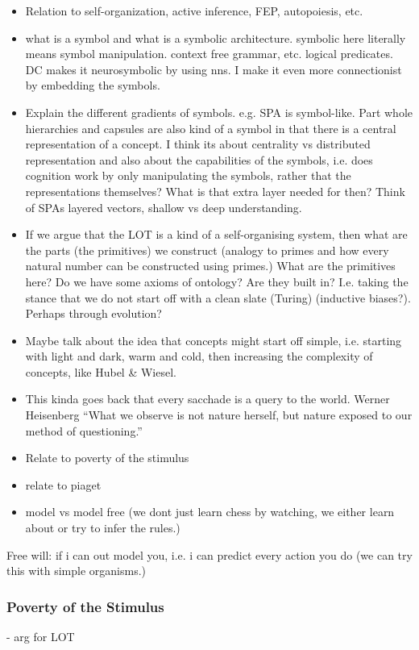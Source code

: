 \begin{itemize}
    \item Relation to self-organization, active inference, FEP, autopoiesis, etc. 
    \item what is a symbol and what is a symbolic architecture. symbolic here literally means symbol manipulation. context free grammar, etc. logical predicates. DC makes it neurosymbolic by using nns. I make it even more connectionist by embedding the symbols.
    \item Explain the different gradients of symbols. e.g. SPA is symbol-like. Part whole hierarchies and capsules are also kind of a symbol in that there is a central representation of a concept. I think its about centrality vs distributed representation and also about the capabilities of the symbols, i.e. does cognition work by only manipulating the symbols, rather that the representations themselves? What is that extra layer needed for then? Think of SPAs layered vectors, shallow vs deep understanding.
    \item If we argue that the LOT is a kind of a self-organising system, then what are the parts (the primitives) we construct (analogy to primes and how every natural number can be constructed using primes.) What are the primitives here? Do we have some axioms of ontology? Are they built in? I.e. taking the stance that we do not start off with a clean slate (Turing) (inductive biases?). Perhaps through evolution? 
    \item Maybe talk about the idea that concepts might start off simple, i.e. starting with light and dark, warm and cold, then increasing the complexity of concepts, like Hubel \& Wiesel. 
    \item This kinda goes back that every sacchade is a query to the world. Werner Heisenberg “What we observe is not nature herself, but nature exposed to our method of questioning.” 
    \item Relate to poverty of the stimulus
    \item relate to piaget 
    \item model vs model free (we dont just learn chess by watching, we either learn about or try to infer the rules.)
\end{itemize}

Free will: if i can out model you, i.e. i can predict every action you do (we can try this with simple organisms.)


\subsubsection{Poverty of the Stimulus}
- arg for LOT

